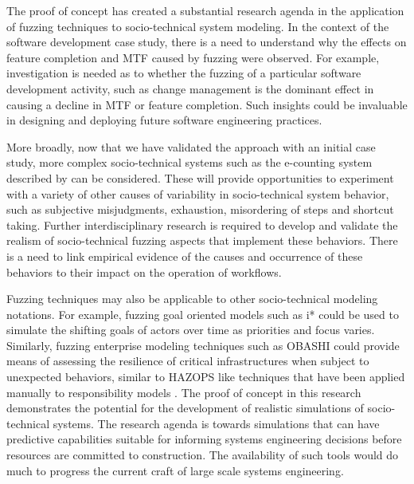 \documentclass{llncs}
\begin{document}
The proof of concept has created a substantial research agenda in the application of fuzzing techniques to
socio-technical system modeling.  In the context of the software development case study, there is a need to understand
why the effects on feature completion and MTF caused by fuzzing were observed.  For example, investigation is needed as
to whether the fuzzing of a particular software development activity, such as change management is the dominant effect
in causing a decline in MTF or feature completion.  Such insights could be invaluable in designing and deploying future
software engineering practices.

More broadly, now that we have validated the approach with an initial case study, more complex socio-technical systems
such as the e-counting system described by \citet{lock07observations} can be considered.  These will provide opportunities to
experiment with a variety of other causes of variability in socio-technical system behavior, such as subjective
misjudgments, exhaustion, misordering of steps and shortcut taking.  Further interdisciplinary research is required to
develop and validate the realism of socio-technical fuzzing aspects that implement these behaviors. There is a need to
link empirical evidence of the causes and occurrence of these behaviors to their impact on the operation of workflows.

Fuzzing techniques may also be applicable to other socio-technical modeling notations.  For example, fuzzing goal
oriented models such as i* could be used to simulate the shifting goals of actors over time as priorities and focus
varies.  Similarly, fuzzing enterprise modeling techniques such as OBASHI could provide means of assessing the
resilience of critical infrastructures when subject to unexpected behaviors, similar to HAZOPS like techniques that have
been applied manually to responsibility models \citep{lock09modelling}. The proof of concept in this research demonstrates
the potential for the development of realistic simulations of socio-technical systems. The research agenda is towards
simulations that can have predictive capabilities suitable for informing systems engineering decisions before resources
are committed to construction.  The availability of such tools would do much to progress the current craft of large
scale systems engineering.







\end{document}
